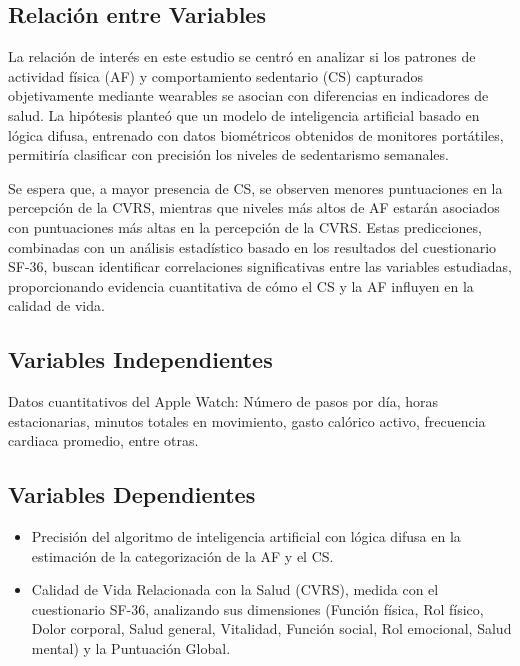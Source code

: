 \subsection{Relación entre Variables}
\label{subsec:relacion_variables}

La relación de interés en este estudio se centró en analizar si los patrones de actividad física (AF) y comportamiento sedentario (CS) capturados objetivamente mediante wearables se asocian con diferencias en indicadores de salud. La hipótesis planteó que un modelo de inteligencia artificial basado en lógica difusa, entrenado con datos biométricos obtenidos de monitores portátiles, permitiría clasificar con precisión los niveles de sedentarismo semanales.

Se espera que, a mayor presencia de CS, se observen menores puntuaciones en la percepción de la CVRS, mientras que niveles más altos de AF estarán asociados con puntuaciones más altas en la percepción de la CVRS. Estas predicciones, combinadas con un análisis estadístico basado en los resultados del cuestionario SF-36, buscan identificar correlaciones significativas entre las variables estudiadas, proporcionando evidencia cuantitativa de cómo el CS y la AF influyen en la calidad de vida.

\subsection{Variables Independientes}
\label{subsec:variables_independientes}

Datos cuantitativos del Apple Watch: Número de pasos por día, horas estacionarias, minutos totales en movimiento, gasto calórico activo, frecuencia cardiaca promedio, entre otras.

\subsection{Variables Dependientes}
\label{subsec:variables_dependientes}

\begin{itemize}
    \item Precisión del algoritmo de inteligencia artificial con lógica difusa en la estimación de la categorización de la AF y el CS.
    
    \item Calidad de Vida Relacionada con la Salud (CVRS), medida con el cuestionario SF-36, analizando sus dimensiones (Función física, Rol físico, Dolor corporal, Salud general, Vitalidad, Función social, Rol emocional, Salud mental) y la Puntuación Global.
\end{itemize}

